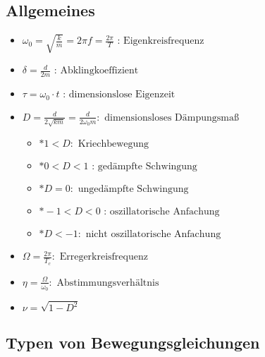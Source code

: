 \documentclass[fleqn,twoside]{article}
\begin{document}
\begin{multicols*}{3}
\subsection{Allgemeines}
\begin{itemize}
\item $\omega_0  =\sqrt{\frac{k}{m}}=2 \pi f=\frac{2 \pi}{T} \text { : Eigenkreisfrequenz } $
\item $\delta  =\frac{d}{2 m} \text { : Abklingkoeffizient } $
\item $\tau  =\omega_0 \cdot t \text { : dimensionslose Eigenzeit } $
\item $D  =\frac{d}{2 \sqrt{k m}} = \frac{d}{2 \omega_0 m}: \text { dimensionsloses Dämpungsmaß } $
\begin{itemize}
    \item $ * 1<D: \text { Kriechbewegung } $
    \item $ * 0<D<1 \text { : gedämpfte Schwingung } $
    \item $ * D=0: \text { ungedämpfte Schwingung } $
    \item $ *-1<D<0 \text { : oszillatorische Anfachung } $
    \item $ * D<-1: \text { nicht oszillatorische Anfachung } $
\end{itemize}
\item $\Omega  =\frac{2 \pi}{T_c}: \text { Erregerkreisfrequenz } $
\item $\eta  =\frac{\Omega}{\omega_0}: \text { Abstimmungsverhältnis } $
\item $\nu  =\sqrt{1-D^2} $
\end{itemize}

\subsection{Typen von Bewegungsgleichungen}


\end{multicols*}
\end{document}
